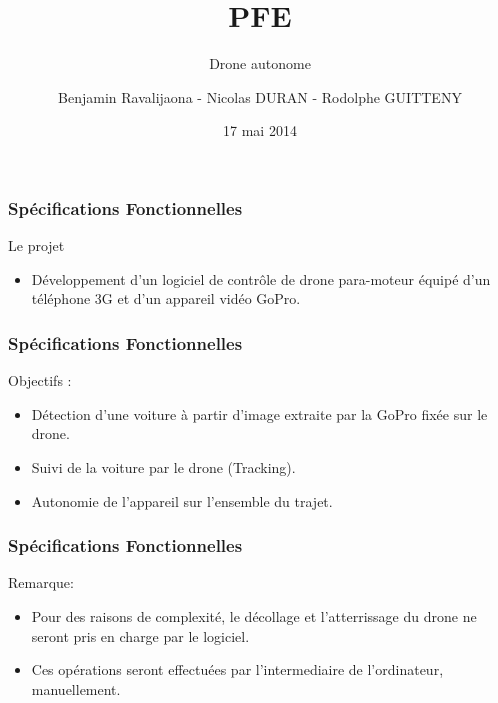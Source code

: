 \documentclass[transparent]{beamer}
\title{PFE \\ }
\subtitle{Drone autonome}
\author{Benjamin  Ravalijaona - Nicolas DURAN - Rodolphe GUITTENY}
\institute{SCIA 2015 \\ EPITA}
\date{17 mai 2014}
\begin{document}
\begin{frame}
	\titlepage
\end{frame}


\begin{frame}
	\frametitle{Spécifications Fonctionnelles}
	\begin{block}{Le projet}
			\begin{itemize}
				\item Développement d’un logiciel de contrôle de drone para-moteur équipé d’un téléphone 3G et d’un appareil vidéo GoPro.
			\end{itemize}
	\end{block}
\end{frame}

\begin{frame}
	\frametitle{Spécifications Fonctionnelles}
	\begin{block}{Objectifs :}
			\begin{itemize}
				\item Détection d’une voiture à partir d’image extraite par la GoPro fixée sur le drone.
				\item Suivi de la voiture par le drone (Tracking).
				\item Autonomie de l'appareil sur l'ensemble du trajet.
			\end{itemize}
	\end{block}
\end{frame}

\begin{frame}
	\frametitle{Spécifications Fonctionnelles}
	\begin{block}{Remarque:}
			\begin{itemize}
				\item Pour des raisons de complexité, le décollage et l’atterrissage du drone ne seront pris en charge par le logiciel.
				\item Ces opérations seront effectuées par l'intermediaire de l'ordinateur, manuellement.
			\end{itemize}
	\end{block}
\end{frame}
\end{document}
